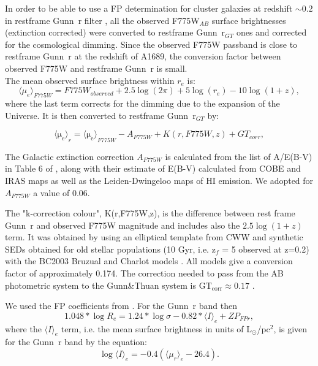 \documentclass[useAMS,usenatbib]{mn2e}
\newcounter{one}   \setcounter{one}{1}
\begin{document}
In order to be able to use a FP determination for cluster galaxies at
redshift $\sim 0.2$ in restframe Gunn~r filter
\citep{joergensen:96,ziegler:01,fritz:05}, all the observed
F775W$_{AB}$ surface brightnesses (extinction corrected) were
converted to restframe Gunn~r$_{GT}$ ones and corrected for the
cosmological dimming.  Since the observed F775W passband is close to
restframe Gunn~r at the redshift of A1689, the conversion factor
between observed F775W and restframe Gunn~r is small.\\

The mean observed surface brightness within $r_e$ is:
\begin{equation}
  \langle\mu_e\rangle_ {F775W}= F775W_{observed} +2.5 \log (2\pi)+5
  \log(r_e) - 10 \log(1+z),
\end{equation}
where the last term corrects for the dimming due to the expansion of
the Universe. It is then converted to restframe Gunn~r$_{GT}$ by:

\begin{equation}
  \label{sbrest}
  \mathrm{\langle \mu_e\rangle}_r  = \mathrm{\langle \mu_e\rangle}_{F775W}
  - A_{F775W} + K(r,F775W,z) + GT_{corr},
\end{equation}

The Galactic extinction correction $A_{F775W}$ is calculated from the
list of A/E(B-V) in Table 6 of \citet{schlegel:98},
along with their estimate of E(B-V) calculated from COBE and IRAS maps
as well as the Leiden-Dwingeloo maps of HI emission. We adopted for
$A_{F775W}$ a value of 0.06.

The "k-correction colour", K(r,F775W,z), is the difference between rest
frame Gunn~r and observed F775W magnitude and includes also the $2.5
\log (1+z)$ term. It was obtained by using an elliptical template from
CWW \citep{coleman:80} and synthetic SEDs obtained for old stellar
populations (10 Gyr, i.e. z$_f$ = 5 observed at z=0.2) with the BC2003
Bruzual and Charlot models \citep{bruzual:03}. All models give a
conversion factor of approximately 0.174.  The correction needed to
pass from the AB photometric system to the Gunn\&Thuan system is
GT$_{\textrm{corr}} \approx 0.17$ .

We used the FP coefficients from \citeauthor{fritz:05}.  For the
Gunn~r band then
\begin{equation}
  1.048*\log R_e=1.24*\log \sigma-0.82* \langle I\rangle_e +ZP_{FPr},
\end{equation}
where the $\langle I\rangle_e$ term, i.e. the mean surface brightness
in units of L$_\odot$/pc$^2$, is given for the Gunn~r band by the
equation:
\begin{equation}
  \log \langle I\rangle_e = -0.4 (\langle\mu_r\rangle_e - 26.4).
\end{equation}
\end{document}
